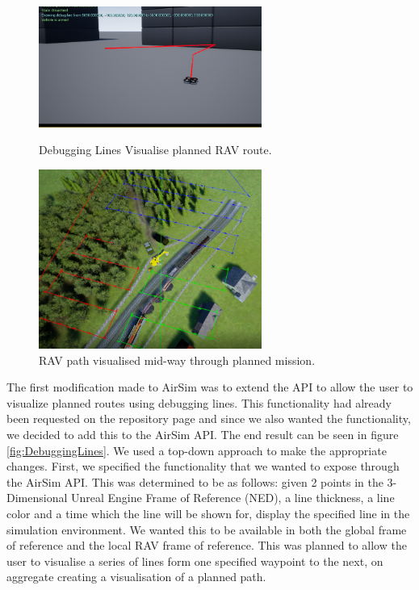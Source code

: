 \begin{figure}
    \centering
    \includegraphics[width=0.65\textwidth]{Chapters/SimulationEnv/Figs/DebuggingLines/DebugLines.png}
    \caption{Debugging Lines Visualise planned RAV route.}
    \label{fig:DebuggingLines}

    \centering
    \includegraphics[width=0.65\textwidth]{Chapters/SimulationEnv/Figs/DebuggingLines/RoutesWithRAVsVisible.png}
    \caption{RAV path visualised mid-way through planned mission.}
    \label{fig:DebuggingLinesPlannedMission}
\end{figure}
The first modification made to AirSim was to extend the API to allow the user to visualize planned routes using debugging lines. This functionality had already been requested on the repository page and since we also wanted the functionality, we decided to add this to the AirSim API. The end result can be seen in figure \ref{fig:DebuggingLines}. We used a top-down approach to make the appropriate changes. First, we specified the functionality that we wanted to expose through the AirSim API. This was determined to be as follows: given 2 points in the 3-Dimensional Unreal Engine Frame of Reference (NED), a line thickness, a line color and a time which the line will be shown for, display the specified line in the simulation environment. We wanted this to be available in both the global frame of reference and the local RAV frame of reference. This was planned to allow the user to visualise a series of lines form one specified waypoint to the next, on aggregate creating a visualisation of a planned path.
\newline


